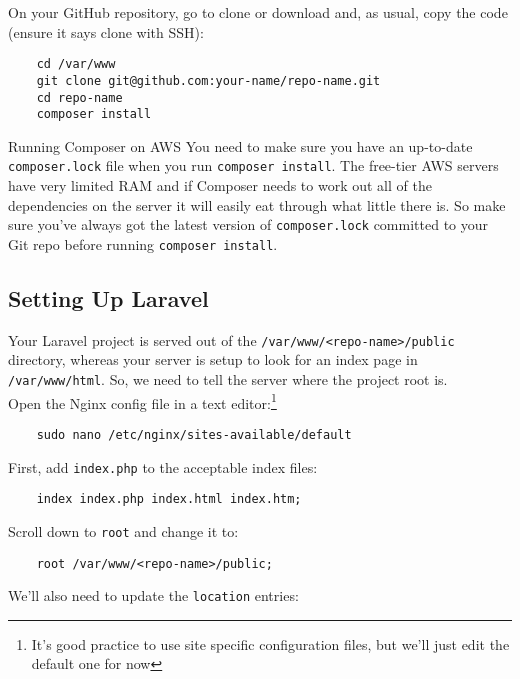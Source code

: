 On your GitHub repository, go to clone or download and, as usual, copy the code (ensure it says clone with SSH):

\begin{verbatim}
    cd /var/www
    git clone git@github.com:your-name/repo-name.git
    cd repo-name
    composer install
\end{verbatim}

\begin{infobox}{Running Composer on AWS}
    You need to make sure you have an up-to-date \texttt{composer.lock} file when you run \texttt{composer install}. The free-tier AWS servers have very limited RAM and if Composer needs to work out all of the dependencies on the server it will easily eat through what little there is. So make sure you've always got the latest version of \texttt{composer.lock} committed to your Git repo before running \texttt{composer install}.
\end{infobox}


\subsection{Setting Up Laravel}

Your Laravel project is served out of the \texttt{/var/www/<repo-name>/public} directory, whereas your server is setup to look for an index page in \texttt{/var/www/html}. So, we need to tell the server where the project root is.
\\

Open the Nginx config file in a text editor:\footnote{It's good practice to use site specific configuration files, but we'll just edit the default one for now}

\begin{verbatim}
    sudo nano /etc/nginx/sites-available/default
\end{verbatim}

First, add \texttt{index.php} to the acceptable index files:

\begin{verbatim}
    index index.php index.html index.htm;
\end{verbatim}

Scroll down to \texttt{root} and change it to:

\begin{verbatim}
    root /var/www/<repo-name>/public;
\end{verbatim}

We'll also need to update the \texttt{location} entries:

